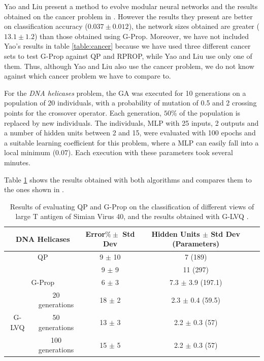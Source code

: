 \documentclass{elsart}
\begin{document}
Yao and Liu present a method to evolve modular neural networks and the results obtained on the cancer problem in \cite{Yao98b}. However the results they present are better on classification accuracy ($0.037 \pm 0.012$), the network sizes obtained are greater ($13.1 \pm 1.2$) than those obtained using G-Prop. Moreover, we have not included Yao's results in table \ref{table:cancer} because we have used three different cancer sets to test G-Prop against QP and RPROP, while Yao and Liu use only one of them. Thus, although Yao and Liu also use the cancer problem, we do not know against which cancer problem we have to compare to.


For the \emph{DNA helicases} problem, the GA was executed for 10 generations on a population of 20 individuals, with a probability of mutation of 0.5 and 2 crossing points for the crossover operator. Each generation, $50\%$ of the population is replaced by new individuals.
The individuals, MLP with 25 inputs, 2 outputs and a number of hidden units between 2 and 15, were evaluated with 100 epochs and a suitable learning coefficient for this problem, where a MLP can easily fall into a local minimum (0.07).
Each execution with these parameters took several minutes.

Table \ref{table:heli} shows the results obtained with both algorithms and compares them to the ones shown in \cite{heliNPL}.

\begin{table}
\begin{center}
\begin{tabular}{|c|c|c|c|c|}
\hline 
\multicolumn{2}{|c|}{DNA Helicases} & Error$\% \pm$ Std Dev & Hidden Units $\pm$ Std Dev (Parameters)  \\
\hline
\hline
\multicolumn{2}{|c|}{QP}     &  9 $\pm$ 10  &  7 (189)  \\
\multicolumn{2}{|c|}{}       &  9 $\pm$  9  &  11 (297)  \\
\hline
\multicolumn{2}{|c|}{G-Prop} & 6  $\pm$ 3   &  7.3 $\pm$ 3.9 (197.1)  \\
\hline
        &  20 generations &  18   $\pm$   2    &  2.3 $\pm$ 0.4 (59.5) \\
  G-LVQ &  50 generations &  13   $\pm$   3    &  2.2 $\pm$ 0.3 (57) \\
        & 100 generations &  15   $\pm$   5    &  2.2 $\pm$ 0.3 (57)\\
\hline

\end{tabular}
\end{center}
\caption{\small{Results of evaluating QP and G-Prop on the classification of different views of large T antigen of Simian Virus 40, and the results obtained with G-LVQ \cite{heliNPL}.}}
\label{table:heli}
\end{table}
\end{document}

